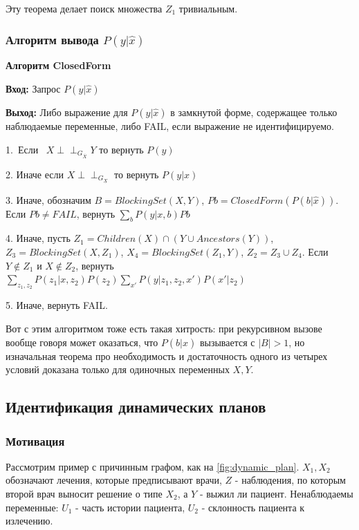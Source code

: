 \documentclass[fleqn]{article}
\newcommand{\independent}{\perp \!\!\! \perp}
\numberwithin{equation}{section}
\numberwithin{theorem}{section}
\numberwithin{figure}{section}
\numberwithin{lemma}{section}
\begin{document}
Эту теорема делает поиск множества $Z_1$ тривиальным.

\subsubsection*{Алгоритм вывода $P(y|\hat x)$}

\textbf{Алгоритм ClosedForm}

\textbf{Вход:} Запрос $P(y|\hat x)$

\textbf{Выход:} Либо выражение для $P(y|\hat x)$ в замкнутой форме, содержащее только наблюдаемые переменные, либо FAIL, если выражение не идентифицируемо.

1. Если  $X \independent_{G_{\overline X}} Y$ то вернуть $P(y)$

2. Иначе если $X \independent_{G_{\underline{X}}}$ то вернуть $P(y|x)$

3. Иначе, обозначим $B = BlockingSet(X, Y)$, $Pb = ClosedForm(P(b|\hat x))$. Если $Pb \neq FAIL$, вернуть $\sum\limits_{b}P(y|x,b)Pb$

4. Иначе, пусть $Z_1 = Children(X) \cap (Y \cup Ancestors(Y))$, $Z_3 = BlockingSet(X, Z_1)$, $X_4 = BlockingSet(Z_1, Y)$, $Z_2 = Z_3 \cup Z_4$. Если $Y \notin Z_1$ и $X \notin Z_2$, вернуть $\sum\limits_{z_1, z_2}P(z_1|x,z_2)P(z_2)\sum\limits_{x'}P(y|z_1, z_2, x')P(x'|z_2)$

5. Иначе, вернуть FAIL.


Вот с этим алгоритмом тоже есть такая хитрость: при рекурсивном вызове вообще говоря может оказаться, что $P(b|\hat x)$ вызывается с $|B| > 1$, но изначальная теорема про необходимость и достаточность одного из четырех условий доказана только для одиночных переменных $X, Y$. 

\subsection*{Идентификация динамических планов}

\subsubsection*{Мотивация}

Рассмотрим пример с причинным графом, как на \ref{fig:dynamic_plan}. $X_1, X_2$ обозначают лечения, которые предписывают врачи, $Z$ - наблюдения, по которым второй врач выносит решение о типе $X_2$, а $Y$ - выжил ли пациент. Ненаблюдаемы переменные: $U_1$ - часть истории пациента, $U_2$ - склонность пациента к излечению. 
\end{document}
